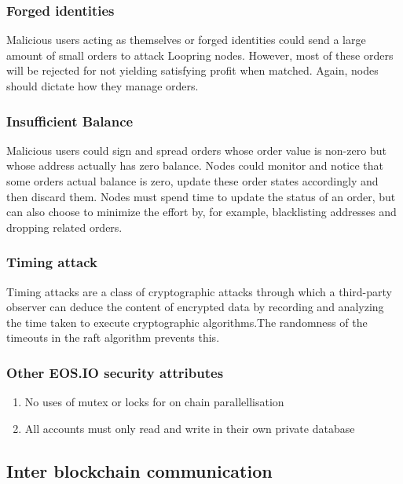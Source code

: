 \documentclass[]{article}
\begin{document}
			
		
		\subsubsection{Forged identities}
		Malicious users acting as themselves or forged identities 
		could send a large amount of small orders to attack Loopring
		nodes. However, most of these orders will be rejected 
		for not yielding satisfying profit when matched. 
		Again, nodes should dictate how they manage orders.
		
		\subsubsection{Insufficient Balance}
		Malicious users could sign and spread orders whose order 
		value is non-zero but whose address actually has zero 
		balance. Nodes could monitor and notice that some orders 
		actual balance is zero, update these order states accordingly
		and then discard them. Nodes must spend time to update
		the status of an order, but can also choose to minimize the
		effort by, for example, blacklisting addresses and dropping
		related orders.
		
		\subsubsection{Timing attack}
		 Timing attacks are a class of cryptographic attacks through which a third-party observer can deduce the content of encrypted data by recording and analyzing the time taken to execute cryptographic algorithms.The randomness of the timeouts in the raft algorithm prevents this.
		
		\subsubsection{Other EOS.IO security attributes}
		\begin{enumerate}
		\item No uses of mutex or locks for on chain parallellisation
		\item All accounts must only read and write in their own private database
		\end{enumerate}
		
	\subsection{Inter blockchain communication}
	
\end{document}
